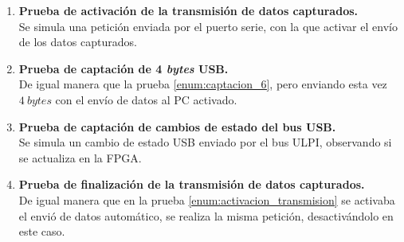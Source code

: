 \begin{enumerate}
    \item \textbf{Prueba de activación de la transmisión de datos capturados.}{\label{enum:activacion_transmision}} \\
    Se simula una petición enviada por el puerto serie, con la que activar el envío de los datos capturados.
    
    \item \textbf{Prueba de captación de 4 \emph{bytes} USB.} \\
    De igual manera que la prueba \ref{enum:captacion_6}, pero enviando esta vez $4~bytes$ con el envío de datos al PC activado.
    
    \item \textbf{Prueba de captación de cambios de estado del bus USB.} \\
    Se simula un cambio de estado USB enviado por el bus ULPI, observando si se actualiza en la FPGA.
    
    \item \textbf{Prueba de finalización de la transmisión de datos capturados.} \\
    De igual manera que en la prueba \ref{enum:activacion_transmision} se activaba el envió de datos automático, se realiza la misma petición, desactivándolo en este caso.
\end{enumerate}




